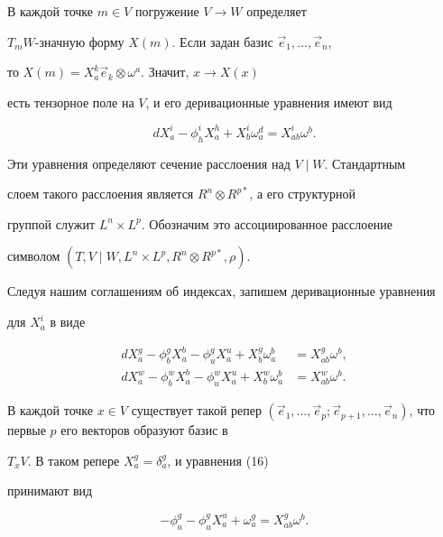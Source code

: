 В каждой точке $m \in V$ погружение $V \to W$ определяет


$T_m W$-значную форму $X(m)$. Если задан базис $\Vec e_1,\dotsc,\Vec e_n$,


то $X(m) = X^k_a \Vec e_k \otimes \omega^a$. Значит, $x \to X(x)$


есть тензорное поле на $V$, и его деривационные уравнения имеют вид


$$


dX^i_a - \phi^i_h X^h_a + X^i_b \omega^d_a = X^i_{ab} \omega^b.


$$


Эти уравнения определяют сечение расслоения над $V \mid W$. Стандартным


слоем такого расслоения является $R^n \otimes R^{p*}$, а его структурной


группой служит $L^n \times L^p$. Обозначим это ассоциированное расслоение


символом $(T, V \mid W, L^n \times L^p, R^n \otimes R^{p*}, \rho)$.





Следуя нашим соглашениям об индексах, запишем деривационные уравнения


для $X^i_a$ в виде


\begin{align}


dX^g_a - \phi^g_b X^b_a - \phi^g_u X^u_a + X^g_b \omega^b_a &=


X^g_{ab} \omega^b, \\


dX^w_a - \phi^w_b X^b_a - \phi^w_u X^u_a + X^w_b \omega^b_a &=


X^w_{ab} \omega^b.


\end{align}


В каждой точке $x \in V$ существует такой репер $(\Vec e_1,\dotsc,\Vec e_p;


\Vec e_{p+1},\dotsc,\Vec e_n)$, что первые $p$ его векторов образуют базис в


$T_x V$. В таком репере $X^g_a = \delta^g_a$, и уравнения (16)


принимают вид


\begin{equation}


- \phi^g_a - \phi^g_u X^u_a + \omega^g_a = X^g_{ab} \omega^b.


\end{equation}





